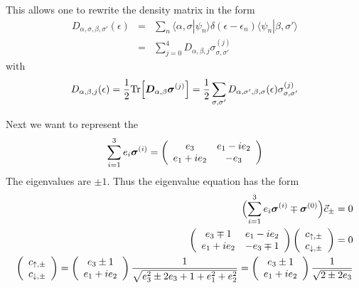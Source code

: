 \documentclass[11pt,a4paper]{report}
\begin{document}
This allows one to rewrite the density matrix in the form
\begin{eqnarray}
D_{\alpha,\sigma,\beta,\sigma'}(\epsilon)
&=&\sum_n \langle\alpha,\sigma|\psi_n\rangle \delta(\epsilon-\epsilon_n)
\langle\psi_n|\beta,\sigma'\rangle
\nonumber\\
&=&\sum_{j=0}^4 D_{\alpha,\beta,j}\sigma_{\sigma,\sigma'}^{(j)}
\end{eqnarray}
with
\begin{eqnarray}
D_{\alpha,\beta,j}(\epsilon)
=\frac{1}{2}\mathrm{Tr}\Bigl[\bm{D}_{\alpha,\beta}\bm{\sigma}^{(j)}\Bigr]
=\frac{1}{2}\sum_{\sigma,\sigma'}D_{\alpha,\sigma',\beta,\sigma}(\epsilon)
\sigma_{\sigma,\sigma'}^{(j)}
\end{eqnarray}



Next we want to represent the 
\begin{eqnarray}
\sum_{i=1}^3 e_i\bm{\sigma}^{(i)}
=\left(\begin{array}{cc}
e_3&e_1-ie_2\\e_1+ie_2&-e_3\end{array}\right)
\end{eqnarray}
The eigenvalues are $\pm 1$. Thus the eigenvalue equation has the form
\begin{eqnarray}
\Bigl(\sum_{i=1}^3 e_i\mat{\sigma}^{(i)}\mp\mat{\sigma}^{(0)}\Bigr)\vec{c}_\pm=0
\nonumber\\
%
\left(\begin{array}{cc}
e_3\mp 1&e_1-ie_2\\e_1+ie_2&-e_3\mp 1\end{array}\right)
\left(\begin{array}{c}
c_{\uparrow,\pm}\\c_{\downarrow,\pm}
\end{array}\right)=0
\nonumber\\
%
\left(\begin{array}{c}
c_{\uparrow,\pm}\\c_{\downarrow,\pm}
\end{array}\right)
=\left(\begin{array}{c}
e_3\pm 1 \\e_1+ie_2
\end{array}\right)\frac{1}{\sqrt{e_3^2\pm2e_3+1+e_1^2+e_2^2}}
=\left(\begin{array}{c}
e_3\pm 1 \\e_1+ie_2
\end{array}\right)
\frac{1}{\sqrt{2\pm2e_3}}
\end{eqnarray}
\end{document}
